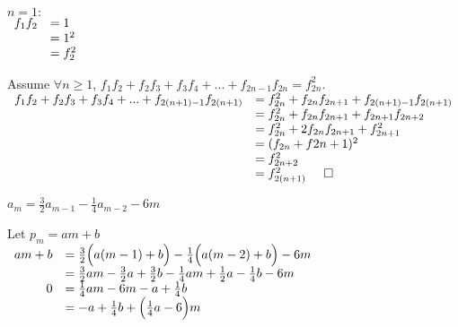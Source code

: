 \documentclass[a4paper, 11pt]{article}
\begin{document}
\begin{myEnumerate}
\begin{myEnumerate}
        \item
        $ n = 1: $ \\ \(
        \begin{array}{ll}
        	f_1 f_2 & = 1 \\
            		& = 1^2 \\
                    & = f_2^2 \\
        \end{array} \\ \)
        
        Assume $\forall n \geq 1$, $f_1 f_2 + f_2 f_3 + f_3 f_4 +...+ f_{2n-1}f_{2n} = f_{2n}^2$. \\
        
        \(
        \begin{array}{ll}
        	f_1 f_2 + f_2 f_3 + f_3 f_4 +...+ f_{2(n+1) - 1}f_{2(n+1)} & = f_{2n}^2 + f_{2n}f_{2n+1} + f_{2(n+1) - 1}f_{2(n+1)} \\
            														   & = f_{2n}^2 + f_{2n}f_{2n+1} + f_{2n+1}f_{2n+2} \\
                                                                       & = f_{2n}^2 + 2f_{2n}f_{2n+1} + f_{2n+1}^2 \\
                                                                       & = (f_{2n} + f{2n+1})^2 \\
                                                                       & = f_{2n+2}^2 \\
                                                                       & = f_{2(n+1)}^2 \hspace{0.5cm} \square
        \end{array} \)
        
    \end{myEnumerate}
    \item
    \begin{myEnumerate}
    	\item
        $a_m = \frac{3}{2}a_{m-1} - \frac{1}{4}a_{m-2} - 6m$
        
        \item
        Let $p_m = am + b$ \\ \( \\
        \begin{array}{rl}
        	am + b & =  \frac{3}{2} \Big( a(m-1)+b \Big) -\frac{1}{4} \Big( a(m-2)+b \Big) - 6m \\
            	   & =  \frac{3}{2}am -\frac{3}{2}a + \frac{3}{2}b - \frac{1}{4}am + \frac{1}{2}a - \frac{1}{4}b - 6m \\
                 0 & = \frac{1}{4}am - 6m - a + \frac{1}{4}b \\
                   & = -a + \frac{1}{4}b + \Big( \frac{1}{4}a - 6 \Big)m
        \end{array} \\ \)
        

\end{myEnumerate}
\end{myEnumerate}
\end{document}
